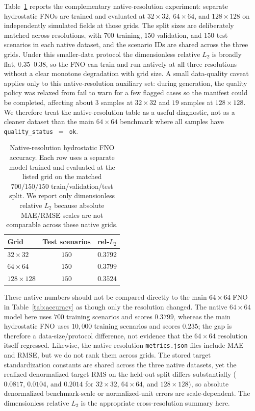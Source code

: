 Table~\ref{tab:crossres-native} reports the complementary native-resolution experiment: separate hydrostatic FNOs are trained and evaluated at $32 \times 32$, $64 \times 64$, and $128 \times 128$ on independently simulated fields at those grids. The split sizes are deliberately matched across resolutions, with $700$ training, $150$ validation, and $150$ test scenarios in each native dataset, and the scenario IDs are shared across the three grids. Under this smaller-data protocol the dimensionless relative $L_2$ is broadly flat, $0.35$--$0.38$, so the FNO can train and run natively at all three resolutions without a clear monotone degradation with grid size. A small data-quality caveat applies only to this native-resolution auxiliary set: during generation, the quality policy was relaxed from fail to warn for a few flagged cases so the manifest could be completed, affecting about $3$ samples at $32 \times 32$ and $19$ samples at $128 \times 128$. We therefore treat the native-resolution table as a useful diagnostic, not as a cleaner dataset than the main $64 \times 64$ benchmark where all samples have \texttt{quality\_status}~$=$~\texttt{ok}.

\begin{table}[H]
\centering
\caption{Native-resolution hydrostatic FNO accuracy. Each row uses a separate model trained and evaluated at the listed grid on the matched $700/150/150$ train/validation/test split. We report only dimensionless relative $L_2$ because absolute MAE/RMSE scales are not comparable across these native grids.}
\label{tab:crossres-native}
\begin{tabular}{lcc}
    \toprule
    Grid & Test scenarios & rel-$L_2$ \\
    \midrule
    $32 \times 32$   & $150$ & $0.3792$ \\
    $64 \times 64$   & $150$ & $0.3799$ \\
    $128 \times 128$ & $150$ & $0.3524$ \\
    \bottomrule
\end{tabular}
\end{table}

These native numbers should not be compared directly to the main $64 \times 64$ FNO in Table~\ref{tab:accuracy} as though only the resolution changed. The native $64 \times 64$ model here uses $700$ training scenarios and scores $0.3799$, whereas the main hydrostatic FNO uses $10{,}000$ training scenarios and scores $0.235$; the gap is therefore a data-size/protocol difference, not evidence that the $64 \times 64$ resolution itself regressed. Likewise, the native-resolution \texttt{metrics.json} files include MAE and RMSE, but we do not rank them across grids. The stored target standardization constants are shared across the three native datasets, yet the realized denormalized target RMS on the held-out split differs substantially ($0.0817$, $0.0104$, and $0.2014$ for $32 \times 32$, $64 \times 64$, and $128 \times 128$), so absolute denormalized benchmark-scale or normalized-unit errors are scale-dependent. The dimensionless relative $L_2$ is the appropriate cross-resolution summary here.

